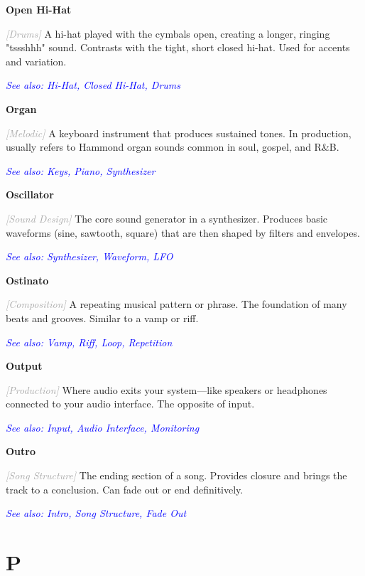 \documentclass[11pt,letterpaper]{article}
\newcommand{\term}[1]{\textbf{\large\color{purple}#1}}
\newcommand{\category}[1]{\textcolor{darkgray}{\textit{\small [#1]}}}
\newcommand{\seealso}[1]{\textcolor{blue}{\textit{See also: #1}}}
\newenvironment{termdef}[1]
  {\noindent\term{#1}\par\nopagebreak}
  {\par\vspace{0.3em}}
\begin{document}
\begin{termdef}{Open Hi-Hat}
\category{Drums}
A hi-hat played with the cymbals open, creating a longer, ringing "tssshhh" sound. Contrasts with the tight, short closed hi-hat. Used for accents and variation.

\seealso{Hi-Hat, Closed Hi-Hat, Drums}
\end{termdef}

\begin{termdef}{Organ}
\category{Melodic}
A keyboard instrument that produces sustained tones. In production, usually refers to Hammond organ sounds common in soul, gospel, and R\&B.

\seealso{Keys, Piano, Synthesizer}
\end{termdef}

\begin{termdef}{Oscillator}
\category{Sound Design}
The core sound generator in a synthesizer. Produces basic waveforms (sine, sawtooth, square) that are then shaped by filters and envelopes.

\seealso{Synthesizer, Waveform, LFO}
\end{termdef}

\begin{termdef}{Ostinato}
\category{Composition}
A repeating musical pattern or phrase. The foundation of many beats and grooves. Similar to a vamp or riff.

\seealso{Vamp, Riff, Loop, Repetition}
\end{termdef}

\begin{termdef}{Output}
\category{Production}
Where audio exits your system—like speakers or headphones connected to your audio interface. The opposite of input.

\seealso{Input, Audio Interface, Monitoring}
\end{termdef}

\begin{termdef}{Outro}
\category{Song Structure}
The ending section of a song. Provides closure and brings the track to a conclusion. Can fade out or end definitively.

\seealso{Intro, Song Structure, Fade Out}
\end{termdef}

\newpage

\section*{P}
\end{document}
